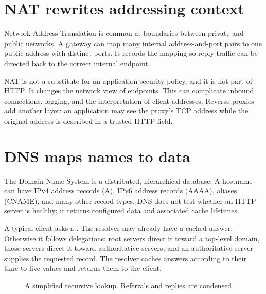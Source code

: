 \section{NAT rewrites addressing context}

Network Address Translation is common at boundaries between private and public
networks. A gateway can map many internal address-and-port pairs to one public
address with distinct ports. It records the mapping so reply traffic can be
directed back to the correct internal endpoint.

NAT is not a substitute for an application security policy, and it is not part
of HTTP. It changes the network view of endpoints. This can complicate inbound
connections, logging, and the interpretation of client addresses. Reverse
proxies add another layer: an application may see the proxy's TCP address while
the original address is described in a trusted HTTP field.

\section{DNS maps names to data}

The Domain Name System is a distributed, hierarchical database. A hostname can
have IPv4 address records (A), IPv6 address records (AAAA), aliases (CNAME), and
many other record types. DNS does not test whether an HTTP server is healthy; it
returns configured data and associated cache lifetimes.

A typical client asks a . The resolver may already
have a cached answer. Otherwise it follows delegations: root servers direct it
toward a top-level domain, those servers direct it toward authoritative servers,
and an authoritative server supplies the requested record. The resolver caches
answers according to their time-to-live values and returns them to the client.

\begin{figure}[htbp]
\centering
{}
\caption{A simplified recursive lookup. Referrals and replies are condensed.}
\label{fig:dns-resolution}
\end{figure}

